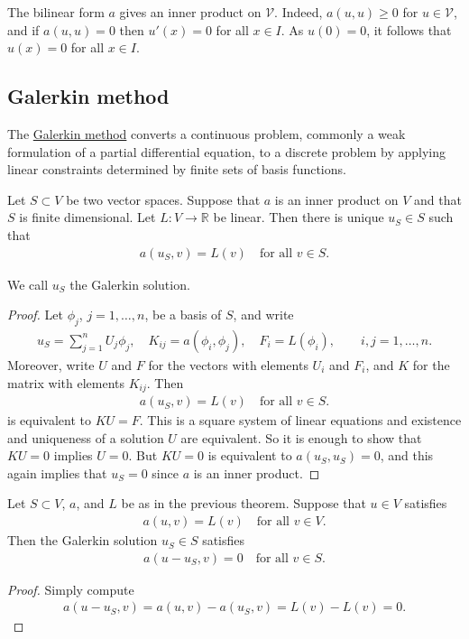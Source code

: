 \documentclass[12pt,oneside]{amsart}
\begin{document}
The bilinear form $a$ gives an inner product on $\mathcal V$. Indeed, $a(u,u) \ge 0$ for $u \in \mathcal V$, and if $a(u,u) = 0$ then $u'(x) = 0$ for all $x \in I$.
As $u(0) = 0$, it follows that $u(x) = 0$ for all $x \in I$.

\subsection{Galerkin method}

The \href{https://en.wikipedia.org/wiki/Galerkin_method}{Galerkin method} converts a continuous problem, commonly a weak formulation of a partial differential equation, to a discrete problem by applying linear constraints determined by finite sets of basis functions.

\begin{theorem}\label{th_gsol}
Let $S \subset V$ be two vector spaces.
Suppose that $a$ is an inner product on $V$ and that $S$ is finite dimensional. 
Let $L : V \to \mathbb R$ be linear. Then there is unique $u_S \in S$ such that 
    \begin{align*}
a(u_S,v) = L(v) \quad \text{for all $v \in S$}.
    \end{align*}
\end{theorem}
We call $u_S$ the Galerkin solution.
\begin{proof}
Let $\phi_j$, $j=1,\dots,n$, be a basis of $S$, and write
    \begin{align*}
u_S = \sum_{j=1}^n U_j \phi_j, 
\quad
K_{ij} = a(\phi_i, \phi_j),
\quad
F_i = L(\phi_i), 
\qquad i,j=1,\dots,n.
    \end{align*}
Moreover, write $U$ and $F$ for the vectors with elements $U_i$ and $F_i$, and $K$ for the matrix with elements $K_{ij}$. Then
    \begin{align*}
a(u_S,v) = L(v) \quad \text{for all $v \in S$}.
    \end{align*}
is equivalent to $KU = F$. This is a square system of linear equations and existence and uniqueness of a solution $U$ are equivalent. So it is enough to show that $KU = 0$ implies $U = 0$. But $KU = 0$ is equivalent to $a(u_S, u_S) = 0$, and this again implies that $u_S = 0$ since $a$ is an inner product.
\end{proof}

\begin{lemma}
Let $S \subset V$, $a$, and $L$ be as in the previous theorem. Suppose that $u \in V$ satisfies
    \begin{align*}
a(u, v) = L(v) \quad \text{for all $v \in V$}.
    \end{align*}
Then the Galerkin solution $u_S  \in S$ satisfies
    \begin{align*}
a(u-u_S,v) = 0 \quad \text{for all $v \in S$}.
    \end{align*}
\end{lemma}
\begin{proof}
Simply compute
    \begin{align*}
a(u-u_S,v) = a(u, v) - a(u_S, v) = L(v) - L(v) = 0.
    \end{align*}
\end{proof}
\end{document}
